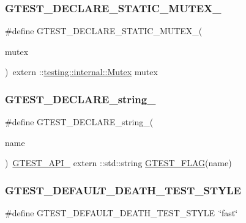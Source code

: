 \subsubsection{\texorpdfstring{GTEST\_DECLARE\_STATIC\_MUTEX\_}{GTEST\_DECLARE\_STATIC\_MUTEX\_}}
{\footnotesize\ttfamily \#define G\+T\+E\+S\+T\+\_\+\+D\+E\+C\+L\+A\+R\+E\+\_\+\+S\+T\+A\+T\+I\+C\+\_\+\+M\+U\+T\+E\+X\+\_\+(\begin{DoxyParamCaption}\item[{}]{mutex }\end{DoxyParamCaption})~extern \+::\mbox{\hyperlink{classtesting_1_1internal_1_1Mutex}{testing\+::internal\+::\+Mutex}} mutex}

\mbox{\label{gtest-port_8h_a9f74eee05f7ee5534139a622fe7da7dd}} 
\subsubsection{\texorpdfstring{GTEST\_DECLARE\_string\_}{GTEST\_DECLARE\_string\_}}
{\footnotesize\ttfamily \#define G\+T\+E\+S\+T\+\_\+\+D\+E\+C\+L\+A\+R\+E\+\_\+string\+\_\+(\begin{DoxyParamCaption}\item[{}]{name }\end{DoxyParamCaption})~\mbox{\hyperlink{gtest-port_8h_aa73be6f0ba4a7456180a94904ce17790}{G\+T\+E\+S\+T\+\_\+\+A\+P\+I\+\_\+}} extern \+::std\+::string \mbox{\hyperlink{gtest-port_8h_a828f4e34a1c4b510da50ec1563e3562a}{G\+T\+E\+S\+T\+\_\+\+F\+L\+AG}}(name)}

\mbox{\label{gtest-port_8h_a491d09ee62f1c9cfeafa3dbf75aaa9e2}} 
\subsubsection{\texorpdfstring{GTEST\_DEFAULT\_DEATH\_TEST\_STYLE}{GTEST\_DEFAULT\_DEATH\_TEST\_STYLE}}
{\footnotesize\ttfamily \#define G\+T\+E\+S\+T\+\_\+\+D\+E\+F\+A\+U\+L\+T\+\_\+\+D\+E\+A\+T\+H\+\_\+\+T\+E\+S\+T\+\_\+\+S\+T\+Y\+LE~\char`\"{}fast\char`\"{}}

